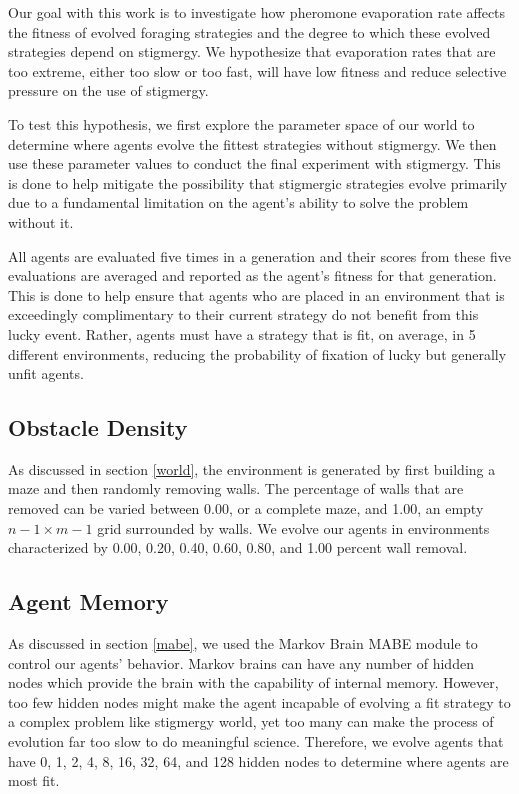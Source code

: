 Our goal with this work is to investigate how pheromone evaporation rate affects the fitness of evolved foraging strategies and the degree to which these evolved strategies depend on stigmergy. We hypothesize that evaporation rates that are too extreme, either too slow or too fast, will have low fitness and reduce selective pressure on the use of stigmergy. 

To test this hypothesis, we first explore the parameter space of our world to determine where agents evolve the fittest strategies without stigmergy. We then use these parameter values to conduct the final experiment with stigmergy. This is done to help mitigate the possibility that stigmergic strategies evolve primarily due to a fundamental limitation on the agent's ability to solve the problem without it.

All agents are evaluated five times in a generation and their scores from these five evaluations are averaged and reported as the agent's fitness for that generation. This is done to help ensure that agents who are placed in an environment that is exceedingly complimentary to their current strategy do not benefit from this lucky event. Rather, agents must have a strategy that is fit, on average, in 5 different environments, reducing the probability of fixation of lucky but generally unfit agents.

\subsection*{Obstacle Density}

As discussed in section \ref{world}, the environment is generated by first building a maze and then randomly removing walls. The percentage of walls that are removed can be varied between 0.00, or a complete maze, and 1.00, an empty $n-1 \times m-1$ grid surrounded by walls. We evolve our agents in environments characterized by 0.00, 0.20, 0.40, 0.60, 0.80, and 1.00 percent wall removal.

\subsection*{Agent Memory}

As discussed in section \ref{mabe}, we used the Markov Brain MABE module to control our agents’ behavior. Markov brains can have any number of hidden nodes which provide the brain with the capability of internal memory. However, too few hidden nodes might make the agent incapable of evolving a fit strategy to a complex problem like stigmergy world, yet too many can make the process of evolution far too slow to do meaningful science. Therefore, we evolve agents that have 0, 1, 2, 4, 8, 16, 32, 64, and 128 hidden nodes to determine where agents are most fit.

